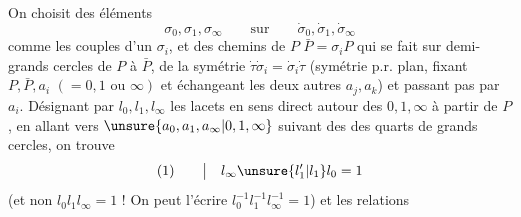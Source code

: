 On choisit des éléments
\[
\sigma_0,\sigma_1,\sigma_\infty\qquad\text{sur}\qquad\dot\sigma_0,\dot\sigma_1,\dot\sigma_\infty
\]
comme les couples d'un $\sigma_i$, et des chemins  de $P$  $\bar P=\sigma_iP$ qui se fait sur   demi-grands cercles de $P$ à $\bar P$,    de la symétrie $\dot\tau\dot\sigma_i=\dot\sigma_i\dot\tau$ (symétrie p.r.  plan, fixant $P,\bar P,a_i$ $(=0,1\text{ ou }\infty)$ et échangeant les deux autres $a_j,a_k$) et  passant pas par $a_i$.  Désignant par $l_0,l_1,l_\infty$  les lacets en sens direct autour des $0,1,\infty$ à partir de $P$, en allant vers $\unsure{a_0,a_1,a_\infty|0,1,\infty}$ suivant des des quarts de grands cercles, on trouve
\[
(1)\qquad\big|\quad l_\infty\unsure{l'_1|l_1}l_0=1
\]
(et non $l_0l_1l_\infty=1$ !  On peut l'écrire $l_0^{-1}l_1^{-1}l_\infty^{-1}=1$)
et les relations

